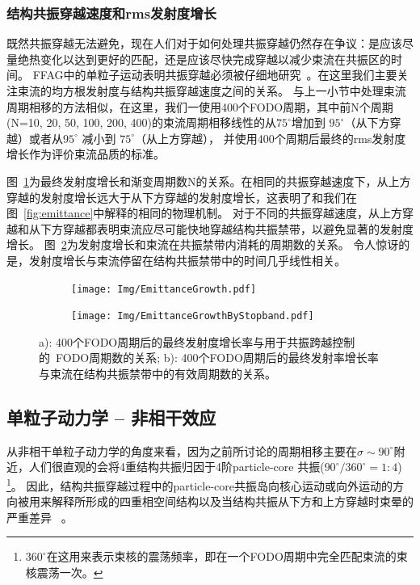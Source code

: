 \subsubsection{结构共振穿越速度和rms发射度增长}
既然共振穿越无法避免，现在人们对于如何处理共振穿越仍然存在争议：是应该尽量绝热变化以达到更好的匹配，还是应该尽快完成穿越以减少束流在共振区的时间。
FFAG中的单粒子运动表明共振穿越必须被仔细地研究~\cite{26}。在这里我们主要关注束流的均方根发射度与结构共振穿越速度之间的关系。
与上一小节中处理束流周期相移的方法相似，在这里，我们一使用400个FODO周期，其中前N个周期(N=10, 20, 50, 100, 200, 400)的束流周期相移线性的从$75^\circ$增加到  $95^\circ$（从下方穿越）或者从$95^\circ$ 减小到 $75^\circ$（从上方穿越），
并使用400个周期后最终的rms发射度增长作为评价束流品质的标准。

图~\ref{sfig:CrossingSpeed_byStopband1}为最终发射度增长和渐变周期数N的关系。在相同的共振穿越速度下，从上方穿越的发射度增长远大于从下方穿越的发射度增长，这表明了和我们在图~\ref{fig:emittance}中解释的相同的物理机制。
对于不同的共振穿越速度，从上方穿越和从下方穿越都表明束流应尽可能快地穿越结构共振禁带，以避免显著的发射度增长。
图~\ref{sfig:CrossingSpeed_byStopband2}为发射度增长和束流在共振禁带内消耗的周期数的关系。
令人惊讶的是，发射度增长与束流停留在结构共振禁带中的时间几乎线性相关。

\begin{figure}[thbp]
    \centering
    \begin{subfigure}[b]{0.48\textwidth}
        \texttt{[image: Img/EmittanceGrowth.pdf]}
        \caption{}
        \label{sfig:CrossingSpeed_byStopband1}
    \end{subfigure}
    \begin{subfigure}[b]{0.48\textwidth}
        \texttt{[image: Img/EmittanceGrowthByStopband.pdf]}
        \caption{}
        \label{sfig:CrossingSpeed_byStopband2}
    \end{subfigure}
    \caption{
    a): 400个FODO周期后的最终发射度增长率与用于共振跨越控制的~FODO周期数的关系;
    b): 400个FODO周期后的最终发射率增长率与束流在结构共振禁带中的有效周期数的关系。}
    \label{fig:CrossingSpeed}
\end{figure}

\subsection{单粒子动力学 -- 非相干效应}
\label{section:Crossing_Incoherent}
从非相干单粒子动力学的角度来看，因为之前所讨论的周期相移主要在$\sigma\sim90^\circ$附近，人们很直观的会将4重结构共振归因于4阶particle-core 共振($90^\circ/360^\circ=1:4$)
\footnote{$360^\circ$在这用来表示束核的震荡频率，即在一个FODO周期中完全匹配束流的束核震荡一次。}。
因此，结构共振穿越过程中的particle-core共振岛向核心运动或向外运动的方向被用来解释所形成的四重相空间结构以及当结构共振从下方和上方穿越时束晕的严重差异~\cite{25} 。

